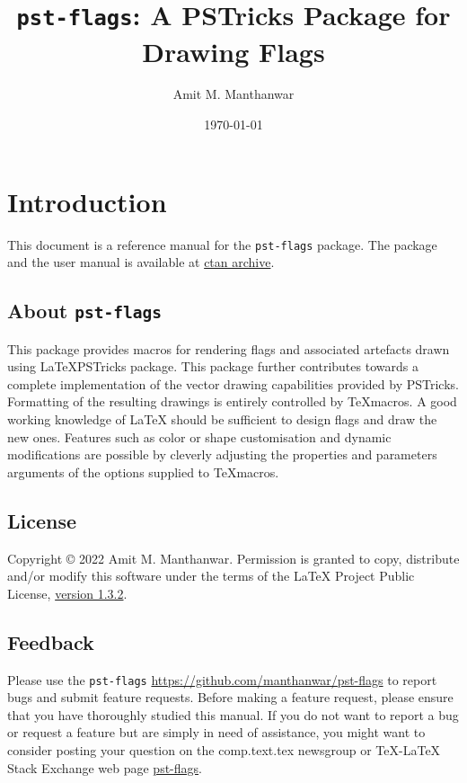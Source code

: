\documentclass{amm-pst-doc}
\title{\vspace*{-10mm}
\texttt{pst-flags}: A PSTricks Package for Drawing Flags}
\author{Amit M. Manthanwar}
\date{\today}
\begin{document}
\maketitle

\section{Introduction}
This document is a reference manual for the \texttt{pst-flags} package. The package and the user manual is available at \href{https://ctan.org/tex-archive/macros/latex/contrib/pst-flags}{ctan archive}.

\subsection{About \texttt{pst-flags}}
This package provides macros for rendering flags and associated artefacts drawn using \LaTeX PSTricks package. This package further contributes towards a complete implementation of the vector drawing capabilities provided by PSTricks. Formatting of the resulting drawings is entirely controlled by \TeX macros. A good working knowledge of LaTeX should be sufficient to design flags and draw the new ones. Features such as color or shape customisation and dynamic modifications are possible by cleverly adjusting the properties and parameters arguments of the options supplied to \TeX macros.

\subsection{License}
Copyright © 2022 Amit M. Manthanwar. Permission is granted to
copy, distribute and/or modify this software under the terms of the LaTeX Project Public License, \href{https://www.latex-project.org/lppl.txt}{version 1.3.2}.

\subsection{Feedback}
Please use the \texttt{pst-flags} \href{project page on GitHub}{https://github.com/manthanwar/pst-flags} to report bugs and submit feature requests. Before making a feature request, please ensure that you have thoroughly studied this manual. If you do not want to report a bug or request a feature but are simply in need of assistance, you might want to consider posting your question on the comp.text.tex newsgroup or TeX-LaTeX Stack Exchange web page  \href{https://tex.stackexchange.com/questions/tagged/pst-flags}{pst-flags}.
\end{document}
